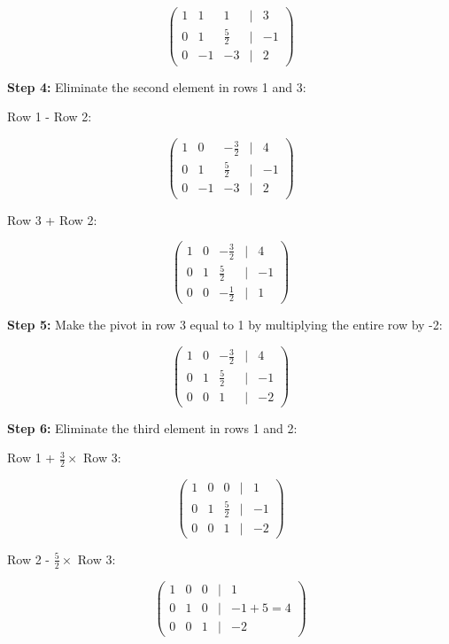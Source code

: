 \[
    \begin{pmatrix}
    1 & 1 & 1 & | & 3 \\
    0 & 1 & \frac{5}{2} & | & -1 \\
    0 & -1 & -3 & | & 2
    \end{pmatrix}
\]

\textbf{Step 4:} Eliminate the second element in rows 1 and 3:

Row 1 - Row 2:

\[
    \begin{pmatrix}
    1 & 0 & -\frac{3}{2} & | & 4 \\
    0 & 1 & \frac{5}{2} & | & -1 \\
    0 & -1 & -3 & | & 2
    \end{pmatrix}
\]

Row 3 + Row 2:

\[
    \begin{pmatrix}
    1 & 0 & -\frac{3}{2} & | & 4 \\
    0 & 1 & \frac{5}{2} & | & -1 \\
    0 & 0 & -\frac{1}{2} & | & 1
    \end{pmatrix}
\]

\textbf{Step 5:} Make the pivot in row 3 equal to 1 by multiplying the entire row by -2:

\[
    \begin{pmatrix}
    1 & 0 & -\frac{3}{2} & | & 4 \\
    0 & 1 & \frac{5}{2} & | & -1 \\
    0 & 0 & 1 & | & -2
    \end{pmatrix}
\]

\textbf{Step 6:} Eliminate the third element in rows 1 and 2:

Row 1 + \(\frac{3}{2} \times\) Row 3:

\[
    \begin{pmatrix}
    1 & 0 & 0 & | & 1 \\
    0 & 1 & \frac{5}{2} & | & -1 \\
    0 & 0 & 1 & | & -2
    \end{pmatrix}
\]

Row 2 - \(\frac{5}{2} \times\) Row 3:

\[
    \begin{pmatrix}
    1 & 0 & 0 & | & 1 \\
    0 & 1 & 0 & | & -1 + 5 = 4 \\
    0 & 0 & 1 & | & -2
    \end{pmatrix}
\]

